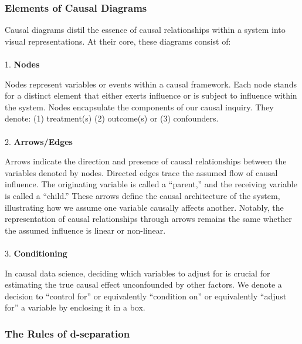 \documentclass[
  singlecolumn]{article}
\makeatletter
\let\oldparagraph\paragraph
\renewcommand{\paragraph}{
    \@ifstar
      \xxxParagraphStar
      \xxxParagraphNoStar
  }
\newcommand{\xxxParagraphStar}[1]{\oldparagraph*{#1}\mbox{}}
\newcommand{\xxxParagraphNoStar}[1]{\oldparagraph{#1}\mbox{}}
\makeatother
\begin{document}
\subsubsection{Elements of Causal
Diagrams}\label{elements-of-causal-diagrams}

Causal diagrams distil the essence of causal relationships within a
system into visual representations. At their core, these diagrams
consist of:

\paragraph{\texorpdfstring{1. \textbf{Nodes}}{1. Nodes}}\label{nodes}

Nodes represent variables or events within a causal framework. Each node
stands for a distinct element that either exerts influence or is subject
to influence within the system. Nodes encapsulate the components of our
causal inquiry. They denote: (1) treatment(s) (2) outcome(s) or (3)
confounders.

\paragraph{\texorpdfstring{2.
\textbf{Arrows/Edges}}{2. Arrows/Edges}}\label{arrowsedges}

Arrows indicate the direction and presence of causal relationships
between the variables denoted by nodes. Directed edges trace the assumed
flow of causal influence. The originating variable is called a
``parent,'' and the receiving variable is called a ``child.'' These
arrows define the causal architecture of the system, illustrating how we
assume one variable causally affects another. Notably, the
representation of causal relationships through arrows remains the same
whether the assumed influence is linear or non-linear.

\paragraph{\texorpdfstring{3.
\textbf{Conditioning}}{3. Conditioning}}\label{conditioning}

In causal data science, deciding which variables to adjust for is
crucial for estimating the true causal effect unconfounded by other
factors. We denote a decision to ``control for'' or equivalently
``condition on'' or equivalently ``adjust for'' a variable by enclosing
it in a box.

\subsubsection{The Rules of
d-separation}\label{the-rules-of-d-separation}
\end{document}
